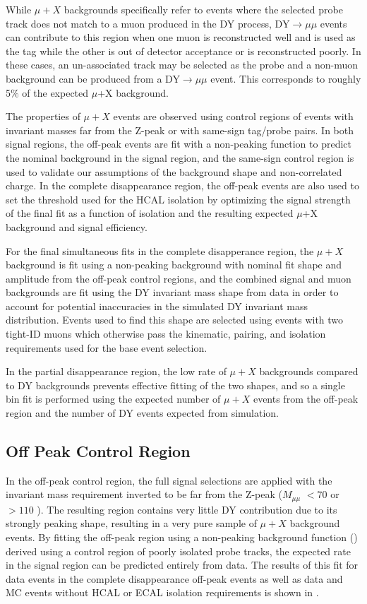 While $\mu+X$ backgrounds specifically refer to events where the selected probe track does not match to a muon produced in the DY process, DY$\rightarrow\mu\mu$ events can contribute to this region when one muon is reconstructed well and is used as the tag while the other is out of detector acceptance or is reconstructed poorly. 
In these cases, an un-associated track may be selected as the probe and a non-muon background can be produced from a DY$\rightarrow\mu\mu$ event. 
This corresponds to roughly 5$\%$ of the expected $\mu$+X background.

The properties of $\mu+X$ events are observed using control regions of events with invariant masses far from the Z-peak or with same-sign tag/probe pairs.
In both signal regions, the off-peak events are fit with a non-peaking function to predict the nominal background in the signal region, and the same-sign control region is used to validate our assumptions of the background shape and non-correlated charge.
In the complete disappearance region, the off-peak events are also used to set the threshold used for the HCAL isolation by optimizing the signal strength of the final fit as a function of isolation and the resulting expected $\mu$+X background and signal efficiency.

For the final simultaneous fits in the complete disapperance region, the $\mu+X$ background is fit using a non-peaking background with nominal fit shape and amplitude from the off-peak control regions, and the combined signal and muon backgrounds are fit using the DY invariant mass shape from data in order to account for potential inaccuracies in the simulated DY invariant mass distribution.
Events used to find this shape are selected using events with two tight-ID muons which otherwise pass the kinematic, pairing, and isolation requirements used for the base event selection.

In the partial disappearance region, the low rate of $\mu+X$ backgrounds compared to DY backgrounds prevents effective fitting of the two shapes, and so a single bin fit is performed using the expected number of $\mu+X$ events from the off-peak region and the number of DY events expected from simulation.

\subsection{Off Peak Control Region}
In the off-peak control region, the full signal selections are applied with the invariant mass requirement inverted to be far from the Z-peak ($M_{\mu\mu}$ $<70$ or $>110$ \GeV). 
The resulting region contains very little DY contribution due to its strongly peaking shape, resulting in a very pure sample of $\mu+X$ background events. 
By fitting the off-peak region using a non-peaking background function () derived using a control region of poorly isolated probe tracks, the expected rate in the signal region can be predicted entirely from data. 
The results of this fit for data events in the complete disappearance off-peak events as well as data and MC events without HCAL or ECAL isolation requirements is shown in .


